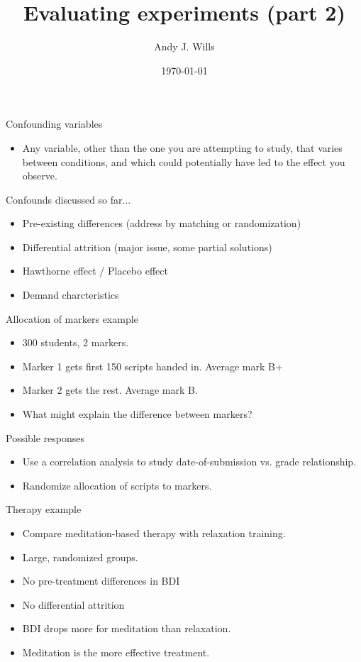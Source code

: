 \documentclass{beamer}
\title[Critical Thinking]{Evaluating experiments (part 2)}
\author{Andy J. Wills}
\date{\today}
\begin{document}
\frame{\titlepage}


\begin{frame}{Confounding variables}
	\begin{itemize}
        \item Any variable, other than the one you are attempting to
          study, that varies between conditions, and which could
          potentially have led to the effect you observe.
	\end{itemize}
\end{frame}

\begin{frame}{Confounds discussed so far...}
	\begin{itemize}
		\item Pre-existing differences (address by matching or randomization)
		\item Differential attrition (major issue, some partial solutions)
		\item Hawthorne effect / Placebo effect
		\item Demand charcteristics
	\end{itemize}
\end{frame}
		
\begin{frame}{Allocation of markers example}
\begin{itemize}
\item 300 students, 2 markers.
\item Marker 1 gets first 150 scripts handed in. Average mark B+
\item Marker 2 gets the rest. Average mark B.
\vspace{12 pt}
\item What might explain the difference between markers?
\end{itemize}
\end{frame}

\begin{frame}{Possible responses}
\begin{itemize}
\item Use a correlation analysis to study date-of-submission vs. grade relationship.
\item Randomize allocation of scripts to markers.
\end{itemize}
\end{frame}


\begin{frame}{Therapy example}
\begin{itemize}
\item Compare meditation-based therapy with relaxation training.
\item Large, randomized groups.
\item No pre-treatment differences in BDI
\item No differential attrition
\item BDI drops more for meditation than relaxation.
\item Meditation is the more effective treatment.
\end{itemize}
\end{frame}
\end{document}
